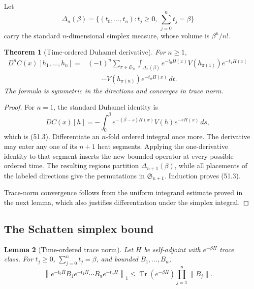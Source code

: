 \documentclass[11pt]{article}
\newtheorem{theorem}{Theorem}[section]
\newtheorem{lemma}[theorem]{Lemma}
\theoremstyle{remark}
\begin{document}
Let
\[
 \Delta_n(\beta)
 =
 \{(t_0,\ldots,t_n):t_j\geq0,\ \sum_{j=0}^nt_j=\beta\}
\]
carry the standard \(n\)-dimensional simplex measure, whose volume
is \(\beta^n/n!\).

\begin{theorem}[Time-ordered Duhamel derivative]
\label{thm:v12v51-Duhamel}
For \(n\geq1\),
\begin{align}
 D^nC(x)[h_1,\ldots,h_n]
 ={}&(-1)^n
 \sum_{\pi\in{\mathfrak S}_n}
 \int_{\Delta_n(\beta)}
 e^{-t_0H(x)}V(h_{\pi(1)})e^{-t_1H(x)}
 \nonumber\\
 &\qquad\cdots
 V(h_{\pi(n)})e^{-t_nH(x)}\,dt.                  \tag{51.3}
\end{align}
The formula is symmetric in the directions and converges in trace
norm.
\end{theorem}

\begin{proof}
For \(n=1\), the standard Duhamel identity is
\[
 DC(x)[h]
 =
 -\int_0^\beta
 e^{-(\beta-s)H(x)}V(h)e^{-sH(x)}\,ds,
\]
which is (51.3).  Differentiate an \(n\)-fold ordered integral once
more.  The derivative may enter any one of its \(n+1\) heat
segments.  Applying the one-derivative identity to that segment
inserts the new bounded operator at every possible ordered time.
The resulting regions partition
\(\Delta_{n+1}(\beta)\), while all placements of the labeled
directions give the permutations in
\({\mathfrak S}_{n+1}\).  Induction proves (51.3).

Trace-norm convergence follows from the uniform integrand estimate
proved in the next lemma, which also justifies differentiation under
the simplex integral.
\end{proof}

\subsection{The Schatten simplex bound}

\begin{lemma}[Time-ordered trace norm]
\label{lem:v12v51-Schatten}
Let \(H\) be self-adjoint with \(e^{-\beta H}\) trace class.  For
\(t_j\geq0\), \(\sum_{j=0}^nt_j=\beta\), and bounded
\(B_1,\ldots,B_n\),
\begin{equation}
 \left\|
 e^{-t_0H}B_1e^{-t_1H}\cdots B_ne^{-t_nH}
 \right\|_1
 \leq
 \operatorname{Tr}(e^{-\beta H})
 \prod_{j=1}^n\|B_j\|.                            \tag{51.4}
\end{equation}
\end{lemma}
\end{document}
